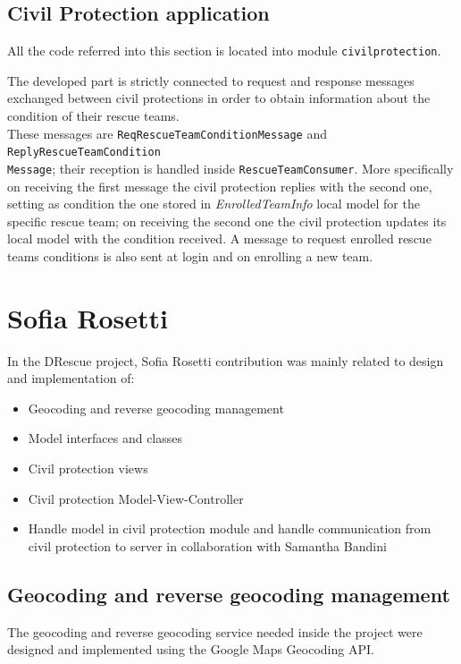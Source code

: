 \documentclass[a4paper,12pt]{report}
\begin{document}
\subsection{Civil Protection application}

All the code referred into this section is located into module \texttt{civilprotection}.

The developed part is strictly connected to request and response messages exchanged between civil protections in order to obtain information about the condition of their rescue teams.
\\These messages are \texttt{ReqRescueTeamConditionMessage} and \texttt{ReplyRescueTeamCondition\\Message}; their reception is handled inside \texttt{RescueTeamConsumer}. More specifically on receiving the first message the civil protection replies with the second one, setting as condition the one stored in \textit{EnrolledTeamInfo} local model for the specific rescue team; on receiving the second one the civil protection updates its local model with the condition received.
A message to request enrolled rescue teams conditions is also sent at login and on enrolling a new team.

\section{Sofia Rosetti}
In the DRescue project, Sofia Rosetti contribution was mainly related to design and implementation of:

\begin{itemize}
\item Geocoding and reverse geocoding management
\item Model interfaces and classes
\item Civil protection views
\item Civil protection Model-View-Controller
\item Handle model in civil protection module and handle communication from civil protection to server in collaboration with Samantha Bandini
\end{itemize}

\subsection{Geocoding and reverse geocoding management}
The geocoding and reverse geocoding service needed inside the project were designed and implemented using the Google Maps Geocoding API.
\end{document}
